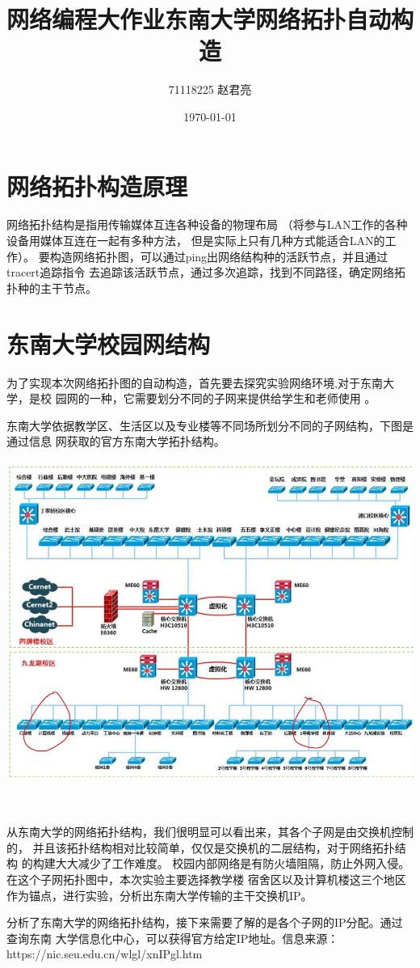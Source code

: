 \documentclass{article} %
\title{\LARGE 网络编程大作业东南大学网络拓扑自动构造}
\author{\Large 71118225 赵君亮}
\date{\today}
\begin{document}
    \maketitle %
    \section{\LARGE 网络拓扑构造原理}
    \par 网络拓扑结构是指用传输媒体互连各种设备的物理布局
    （将参与LAN工作的各种设备用媒体互连在一起有多种方法，
    但是实际上只有几种方式能适合LAN的工作）。
    要构造网络拓扑图，可以通过ping出网络结构种的活跃节点，并且通过tracert追踪指令
    去追踪该活跃节点，通过多次追踪，找到不同路径，确定网络拓扑种的主干节点。
    \section{\LARGE 东南大学校园网结构}
    \par 为了实现本次网络拓扑图的自动构造，首先要去探究实验网络环境,对于东南大学，是校
    园网的一种，它需要划分不同的子网来提供给学生和老师使用 。
    \par 东南大学依据教学区、生活区以及专业楼等不同场所划分不同的子网结构，下图是通过信息
    网获取的官方东南大学拓扑结构。\\
    \\
    \includegraphics[scale=0.5]{pic/东南大学网络拓扑图.JPG}
    \\
    \\
    \\
    \par 从东南大学的网络拓扑结构，我们很明显可以看出来，其各个子网是由交换机控制的，
    并且该拓扑结构相对比较简单，仅仅是交换机的二层结构，对于网络拓扑结构
    的构建大大减少了工作难度。
    校园内部网络是有防火墙阻隔，防止外网入侵。在这个子网拓扑图中，本次实验主要选择教学楼
    宿舍区以及计算机楼这三个地区作为锚点，进行实验，分析出东南大学传输的主干交换机IP。
    \\
    \par 分析了东南大学的网络拓扑结构，接下来需要了解的是各个子网的IP分配。通过查询东南
    大学信息化中心，可以获得官方给定IP地址。信息来源：https://nic.seu.edu.cn/wlgl/xnIPgl.htm
    
\end{document}
